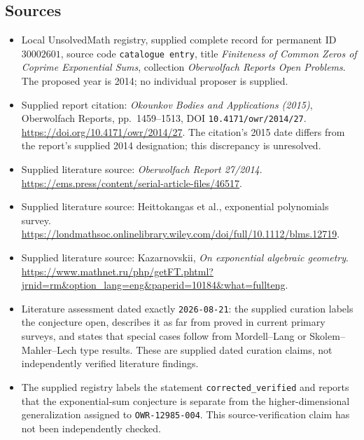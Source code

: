 \documentclass[11pt]{article}
\begin{document}
\subsection{Sources}
\begin{itemize}
\item Local UnsolvedMath registry, supplied complete record for permanent ID \(30002601\), source code \texttt{catalogue entry}, title \emph{Finiteness of Common Zeros of Coprime Exponential Sums}, collection \emph{Oberwolfach Reports Open Problems}. The proposed year is 2014; no individual proposer is supplied.
\item Supplied report citation: \emph{Okounkov Bodies and Applications (2015)}, Oberwolfach Reports, pp.~1459--1513, DOI \texttt{10.4171/owr/2014/27}. \url{https://doi.org/10.4171/owr/2014/27}. The citation's 2015 date differs from the report's supplied 2014 designation; this discrepancy is unresolved.
\item Supplied literature source: \emph{Oberwolfach Report 27/2014}. \url{https://ems.press/content/serial-article-files/46517}.
\item Supplied literature source: Heittokangas et al., exponential polynomials survey. \url{https://londmathsoc.onlinelibrary.wiley.com/doi/full/10.1112/blms.12719}.
\item Supplied literature source: Kazarnovskii, \emph{On exponential algebraic geometry}. \url{https://www.mathnet.ru/php/getFT.phtml?jrnid=rm&option_lang=eng&paperid=10184&what=fullteng}.
\item Literature assessment dated exactly \texttt{2026-08-21}: the supplied curation labels the conjecture open, describes it as far from proved in current primary surveys, and states that special cases follow from Mordell--Lang or Skolem--Mahler--Lech type results. These are supplied dated curation claims, not independently verified literature findings.
\item The supplied registry labels the statement \texttt{corrected\_verified} and reports that the exponential-sum conjecture is separate from the higher-dimensional generalization assigned to \texttt{OWR-12985-004}. This source-verification claim has not been independently checked.
\end{itemize}
\end{document}
